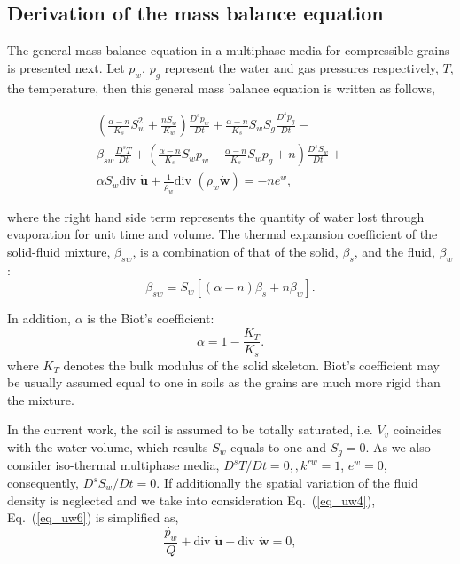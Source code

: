 \documentclass[twocolumn]{svjour3}          %
\begin{document}

\subsection{Derivation of the mass balance equation}\label{subsec:21}
The general mass balance equation in a multiphase media for compressible grains is presented next. 
Let $p_w$, $p_g$ represent the water and gas pressures respectively, $T$, the temperature, %
then this general mass balance equation is written as follows,

\begin{eqnarray}\label{eq_uw6}
\left( \frac{\alpha-n}{K_s}S_w^2+\frac{nS_w}{K_w}\right)\frac{D^s p_w}{D t} + \frac{\alpha-n}{K_s}S_wS_g\frac{D^s p_g}{D t} -&&  \nonumber \\ 
 \beta_{sw}\frac{D^s T}{D t} +  \left(\frac{\alpha-n}{K_s}S_w p_w-\frac{\alpha-n}{K_s}S_w p_g+n\right)\frac{D^s S_w}{D t}  +&&  \nonumber \\ 
\alpha S_w  \mbox{div } \dot{\boldsymbol{u}}  + \frac{1}{\rho_w} \mbox{div } (\rho_w \dot{\boldsymbol{w}}) = - n e^w, &&  %
\end{eqnarray}

where the right hand side term represents the quantity of water lost through evaporation for unit time and volume. The  thermal expansion coefficient of the solid-fluid mixture, $\beta_{sw}$, is a combination of that of the solid, $\beta_s$, and  the fluid, $\beta_w$:
\begin{equation}
\beta_{sw} = S_w [(\alpha-n)\beta_s +n \beta_w].
\end{equation}

In addition, $\alpha$ is the Biot's coefficient:
\begin{equation}\label{eq_uw7}
\alpha=1-\frac{K_T}{K_s}.
\end{equation}
where $K_T$ denotes the %
 bulk modulus of the solid skeleton.  Biot's coefficient may be usually assumed equal to one in soils as the grains are much more rigid than the mixture. 
   
In the current work, the soil is assumed to be totally saturated, i.e. $V_v$ coincides with the water volume, which results  $S_w$ equals to one and $S_g=0$. As we also consider iso-thermal multiphase media,  $D^s T/D t =0, , k^{rw}=1$, $e^w=0$, consequently, %
$D^s S_w/D t =0$. If  additionally the spatial variation of the fluid density is neglected and we take into consideration Eq.~(\ref{eq_uw4}),  Eq.~(\ref{eq_uw6}) is simplified as,
\begin{equation}
\frac{\dot{p_w}}{Q} +  \mbox{div }  \boldsymbol{\dot{u}} + \mbox{div } \boldsymbol{\dot{w}} = 0 \label{eq_uw10},
\end{equation}
\end{document}
